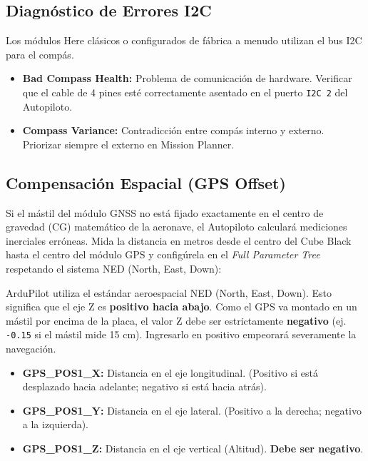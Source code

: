 \documentclass[12pt,a4paper]{article}
\begin{document}
\subsection{Diagnóstico de Errores I2C}
Los módulos Here clásicos o configurados de fábrica a menudo utilizan el bus I2C para el compás.
\begin{itemize}[leftmargin=*]
    \item \textbf{Bad Compass Health:} Problema de comunicación de hardware. Verificar que el cable de 4 pines esté correctamente asentado en el puerto \texttt{I2C 2} del Autopiloto.
    \item \textbf{Compass Variance:} Contradicción entre compás interno y externo. Priorizar siempre el externo en Mission Planner.
\end{itemize}

\subsection{Compensación Espacial (GPS Offset)}
Si el mástil del módulo GNSS no está fijado exactamente en el centro de gravedad (CG) matemático de la aeronave, el Autopiloto calculará mediciones inerciales erróneas. Mida la distancia en metros desde el centro del Cube Black hasta el centro del módulo GPS y configúrela en el \textit{Full Parameter Tree} respetando el sistema NED (North, East, Down):

\begin{warningbox}[title=La Trampa del Eje Z (Orientación NED)]
ArduPilot utiliza el estándar aeroespacial NED (North, East, Down). Esto significa que el eje Z es \textbf{positivo hacia abajo}. Como el GPS va montado en un mástil por encima de la placa, el valor Z debe ser estrictamente \textbf{negativo} (ej. \texttt{-0.15} si el mástil mide 15 cm). Ingresarlo en positivo empeorará severamente la navegación.
\end{warningbox}

\begin{itemize}[leftmargin=*]
    \item \textbf{GPS\_POS1\_X:} Distancia en el eje longitudinal. (Positivo si está desplazado hacia adelante; negativo si está hacia atrás).
    \item \textbf{GPS\_POS1\_Y:} Distancia en el eje lateral. (Positivo a la derecha; negativo a la izquierda).
    \item \textbf{GPS\_POS1\_Z:} Distancia en el eje vertical (Altitud). \textbf{Debe ser negativo}.
\end{itemize}
\end{document}
